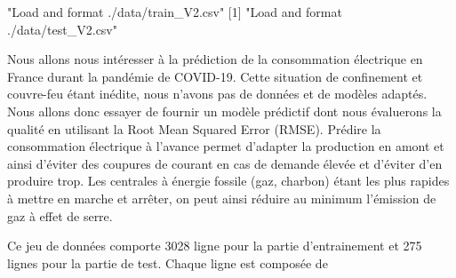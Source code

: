 \documentclass{article}
\begin{document}
\begin{Schunk}
\begin{Soutput}
[1] "Load and format  ./data/train_V2.csv"
[1] "Load and format  ./data/test_V2.csv"
\end{Soutput}
\end{Schunk}
Nous allons nous intéresser à la prédiction de la consommation électrique en France durant la pandémie de COVID-19. Cette situation de confinement et couvre-feu étant inédite, nous n'avons pas de données et de modèles adaptés. Nous allons donc essayer de fournir un modèle prédictif dont nous évaluerons la qualité en utilisant la Root Mean Squared Error (RMSE). Prédire la consommation électrique à l'avance permet d'adapter la production en amont et ainsi d'éviter des coupures de courant en cas de demande élevée et d'éviter d'en produire trop. Les centrales à énergie fossile (gaz, charbon) étant les plus rapides à mettre en marche et arrêter, on peut ainsi réduire au minimum l'émission de gaz à effet de serre.
\par
Ce jeu de données comporte 3028 ligne pour la partie d'entrainement et 275 lignes pour la partie de test.  Chaque ligne est composée de 
\end{document}
